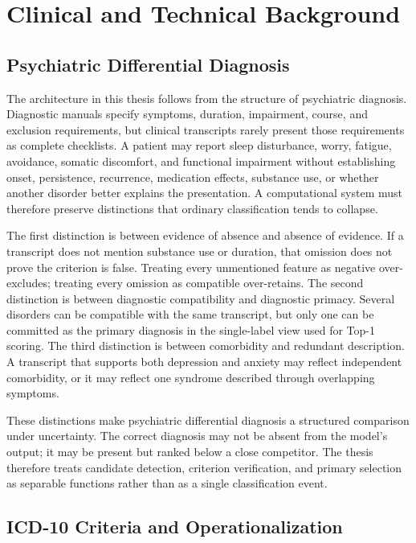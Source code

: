 \chapter{Clinical and Technical Background}
\label{ch:background}

\section{Psychiatric Differential Diagnosis}

The architecture in this thesis follows from the structure of psychiatric diagnosis. Diagnostic manuals specify symptoms, duration, impairment, course, and exclusion requirements, but clinical transcripts rarely present those requirements as complete checklists. A patient may report sleep disturbance, worry, fatigue, avoidance, somatic discomfort, and functional impairment without establishing onset, persistence, recurrence, medication effects, substance use, or whether another disorder better explains the presentation. A computational system must therefore preserve distinctions that ordinary classification tends to collapse.

The first distinction is between evidence of absence and absence of evidence. If a transcript does not mention substance use or duration, that omission does not prove the criterion is false. Treating every unmentioned feature as negative over-excludes; treating every omission as compatible over-retains. The second distinction is between diagnostic compatibility and diagnostic primacy. Several disorders can be compatible with the same transcript, but only one can be committed as the primary diagnosis in the single-label view used for Top-1 scoring. The third distinction is between comorbidity and redundant description. A transcript that supports both depression and anxiety may reflect independent comorbidity, or it may reflect one syndrome described through overlapping symptoms.

These distinctions make psychiatric differential diagnosis a structured comparison under uncertainty. The correct diagnosis may not be absent from the model's output; it may be present but ranked below a close competitor. The thesis therefore treats candidate detection, criterion verification, and primary selection as separable functions rather than as a single classification event.

\section{ICD-10 Criteria and Operationalization}


